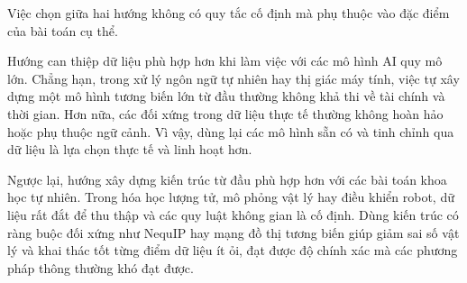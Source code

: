 Việc chọn giữa hai hướng không có quy tắc cố định mà phụ thuộc vào đặc điểm của bài toán cụ thể. 

Hướng can thiệp dữ liệu phù hợp hơn khi làm việc với các mô hình AI quy mô lớn. Chẳng hạn, trong xử lý ngôn ngữ tự nhiên hay thị giác máy tính, việc tự xây dựng một mô hình tương biến lớn từ đầu thường không khả thi về tài chính và thời gian. Hơn nữa, các đối xứng trong dữ liệu thực tế thường không hoàn hảo hoặc phụ thuộc ngữ cảnh. Vì vậy, dùng lại các mô hình sẵn có và tinh chỉnh qua dữ liệu là lựa chọn thực tế và linh hoạt hơn.

Ngược lại, hướng xây dựng kiến trúc từ đầu phù hợp hơn với các bài toán khoa học tự nhiên. Trong hóa học lượng tử, mô phỏng vật lý hay điều khiển robot, dữ liệu rất đắt để thu thập và các quy luật không gian là cố định. Dùng kiến trúc có ràng buộc đối xứng như NequIP hay mạng đồ thị tương biến giúp giảm sai số vật lý và khai thác tốt từng điểm dữ liệu ít ỏi, đạt được độ chính xác mà các phương pháp thông thường khó đạt được.

\clearpage
